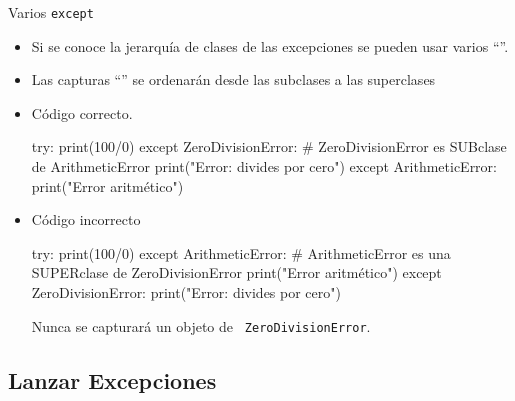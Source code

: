 \documentclass[10pt, envcountsect , spanish]{beamer}
\begin{document}
\begin{frame}[fragile]{Varios {\tt except}} 

\begin{itemize}

\item Si se conoce la jerarquía de clases de las excepciones se pueden usar varios \mbox{``''}.

\item Las capturas ``'' se ordenarán desde las subclases a las superclases



\item Código correcto.
{\scriptsize
\begin{pyconsole}[][frame=single, fontsize=\scriptsize]
try:
    print(100/0)
except ZeroDivisionError:   #  ZeroDivisionError es SUBclase de ArithmeticError
    print("Error: divides por cero")
except ArithmeticError:
    print("Error aritmético")

\end{pyconsole}
}

\item Código incorrecto
{\scriptsize
\begin{pyconsole}[][frame=single, fontsize=\scriptsize]
try:
    print(100/0)
except ArithmeticError:   #  ArithmeticError es una SUPERclase de ZeroDivisionError 
    print("Error aritmético")
except ZeroDivisionError:
    print("Error: divides por cero")

\end{pyconsole}
}

Nunca se capturará un objeto de {\tt \color{red} ZeroDivisionError}.
\end{itemize}

\end{frame}






\subsection{Lanzar Excepciones}
\end{document}

